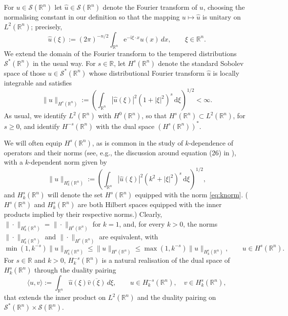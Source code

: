 \documentclass{birkjour}
\theoremstyle{definition}
\theoremstyle{remark}
\numberwithin{equation}{section}
\providecommand{\blue}{\textcolor{blue}}
\newcommand{\R}{\mathbb{R}}
\newcommand{\ri}{\mathrm{i}}
\newcommand{\cS}{\mathcal{S}}
\newcommand{\rd}{\mathrm{d}}
\newcommand{\re}{\mathrm{e}}
\begin{document}
For $u\in \cS(\R^n)$ let $\hat u\in \cS(\R^n)$ denote the Fourier transform of $u$, choosing the normalising constant in our definition so that the mapping $u\mapsto \hat u$ is unitary on $L^2(\R^n)$; precisely, 
$$
\hat u(\xi) := (2\pi)^{-n/2}\int_{\R^n}\re^{-\ri \xi\cdot x}u(x)\, dx, \qquad \xi\in \R^n.
$$
We extend the domain of the Fourier transform to the tempered distributions $\cS^*(\R^n)$ in the usual way. For $s\in \R$, let $H^s(\R^n)$ denote the standard Sobolev space of those $u\in \cS^*(\R^n)$ whose distributional Fourier transform $\hat u$ is locally integrable and satisfies
\begin{equation} \label{eq:unorm}
\|u\|_{H^s(\R^n)} := \left(\int_{\R^n}|\hat u(\xi)|^2(1+|\xi|^2)^s\, \rd \xi\right)^{1/2} < \infty.
\end{equation}
As usual, we identify $L^2(\R^n)$ with $H^0(\R^n)$, so that $H^s(\R^n)\subset L^2(\R^n)$, for $s\geq 0$, and identify $H^{-s}(\R^n)$ with the dual space $(H^s(\R^n))^*$.

We will often equip $H^s(\R^n)$, as is common in the study of $k$-dependence of operators and their norms (see, e.g., the discussion around equation (26) in \cite{CWHewett2015}),  with a $k$-dependent norm given by
\begin{equation} \label{eq:knorm}
\|u\|_{H_k^s(\R^n)} := \left(\int_{\R^n}|\hat u(\xi)|^2(k^2+|\xi|^2)^s\, \rd \xi\right)^{1/2},
\end{equation}
and $H_k^s(\R^n)$ will denote the set $H^s(\R^n)$ equipped with the norm \eqref{eq:knorm}. ($H^s(\R^n)$ and $H^s_k(\R^n)$ are both Hilbert spaces equipped with the inner products implied by their respective norms.)
Clearly, $\|\cdot\|_{H_k^s(\R^n)}= \|\cdot\|_{H^s(\R^n)}$ for $k=1$, and, for every $k>0$, the norms  $\|\cdot\|_{H_k^s(\R^n)}$ and $\|\cdot\|_{H^s(\R^n)}$ are equivalent, with
\begin{equation} \label{eq:equiv}
\min(1,k^{-s})\|u\|_{H_k^s(\R^n)}\leq  \|u\|_{H^s(\R^n)}\leq \max(1,k^{-s})\|u\|_{H_k^s(\R^n)}, \qquad u\in H^s(\R^n).
\end{equation}
For $s\in \R$ and $k>0$, $H_k^{-s}(\R^n)$ is a natural realisation of the dual space of $H_k^s(\R^n)$ through the duality pairing
\begin{equation} \label{eq:dual}
\langle u,v\rangle := \int_{\R^n} \hat u(\xi) \overline{\hat v(\xi)}\, d\xi, \qquad u\in H_k^{-s}(\R^n), \quad v\in H_k^s(\R^n),
\end{equation}
that extends the inner product %
on $L^2(\R^n)$ and the duality pairing on $\cS^*(\R^n)\times \cS(\R^n)$.
\end{document}
